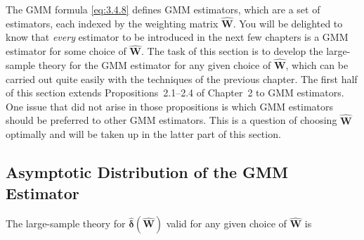 
The GMM formula \eqref{eq:3.4.8} defines GMM estimators, which are a set of estimators,
each indexed by the weighting matrix $\hat{\mathbf{W}}$.  You will be delighted to know that
\emph{every} estimator to be introduced in the next few chapters is a GMM estimator for some
choice of $\hat{\mathbf{W}}$.  The task of this section is to develop the large-sample theory for the
GMM estimator for any given choice of $\hat{\mathbf{W}}$, which can be carried out quite easily
with the techniques of the previous chapter.  The first half of this section extends
Propositions~2.1--2.4 of Chapter~2 to GMM estimators.  One issue that did not arise
in those propositions is which GMM estimators should be preferred to other GMM
estimators.  This is a question of choosing $\hat{\mathbf{W}}$ optimally and will be taken up in the
latter part of this section.

\subsection*{Asymptotic Distribution of the GMM Estimator}

The large-sample theory for $\hat{\boldsymbol{\delta}}(\hat{\mathbf{W}})$ valid for any given choice of
$\hat{\mathbf{W}}$ is

